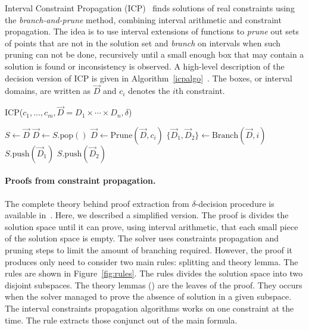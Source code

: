 Interval Constraint Propagation (ICP)~\cite{handbookICP} finds
solutions of real constraints using the \emph{branch-and-prune} method, combining
interval arithmetic and constraint propagation. The idea is to use interval
extensions of functions to \emph{prune} out sets of points that are not in the
solution set and \emph{branch} on intervals when
such pruning can not be done, recursively until a small enough box
that may contain a solution is found or inconsistency is observed.
A high-level description of the decision version of ICP is given in Algorithm~\ref{icpalgo}~\cite{handbookICP,DBLP:conf/cade/GaoAC12}.
The boxes, or interval domains, are written as $\vec D$ and $c_i$ denotes the $i$th constraint.
\begin{algorithm}\label{algo1}
\caption{ICP($c_1,...,c_m, \vec D = D_1\times\cdots\times D_n, \delta$)}\label{icpalgo}
\begin{algorithmic}[1]
\Statex
    \State $S \gets \vec D$
        \State $\vec D \gets S.\mathrm{pop}()$
        \State $\vec D \gets \mathrm{Prune}(\vec D, c_i)$
        \EndWhile
                \State $\{\vec D_1,\vec D_2\} \gets \mathrm{Branch}(\vec D, i)$
                \State $S.\mathrm{push}(\vec D_1)$
                \State $S.\mathrm{push}(\vec D_2)$
            \Else
                \State {}
            \EndIf
        \EndIf
    \EndWhile
    \State {}
\end{algorithmic}
\end{algorithm}





\paragraph{Proofs from constraint propagation.}

The complete theory behind proof extraction from $\delta$-decision procedure is available in~\cite{DBLP:conf/synasc/GaoKC14}.
Here, we described a simplified version.
The proof is divides the solution space until it can prove, using interval arithmetic, that each small piece of the solution space is empty.
The solver uses constraints propagation and pruning steps to limit the amount of branching required.
However, the proof it produces only need to consider two main rules: splitting and theory lemma.
The rules are shown in Figure~\ref{fig:rules}.
The \splt rules divides the solution space into two disjoint subspaces.
The theory lemmas (\thLem) are the leaves of the proof.
They occurs when the solver managed to prove the absence of solution in a given subspace.
The interval constraints propagation algorithms works on one constraint at the time. 
The \weaken rule extracts those conjunct out of the main formula.


